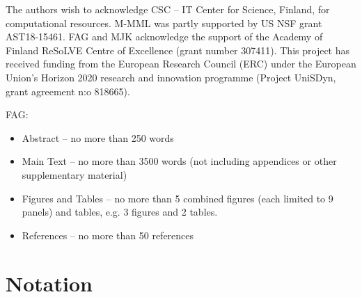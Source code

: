 \documentclass[preprint2]{aastex63}
\newcommand{\fag}[1]{\textcolor{midgreen}{FAG: #1}}
\begin{document}





\acknowledgments
The authors wish to acknowledge CSC – IT Center for Science, Finland, for computational
resources.
 M-MML was partly supported by US NSF grant AST18-15461.
 FAG and MJK acknowledge the support of the Academy of Finland
ReSoLVE Centre of Excellence (grant number 307411).
This project has received funding from the European Research Council (ERC)
under the European Union's Horizon 2020 research and innovation
programme (Project UniSDyn, grant agreement n:o 818665).

{}


\appendix
\fag{
\begin{itemize}
\item
    Abstract – no more than 250 words
\item
    Main Text – no more than 3500 words (not including appendices or other supplementary material)
\item
    Figures and Tables – no more than 5 combined figures (each limited to 9 panels) and tables, e.g. 3 figures and 2 tables.
\item
    References – no more than 50 references
\end{itemize}}

\section{Notation}\label{sec:table}
\end{document}

